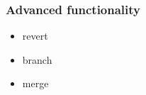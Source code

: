 \begin{frame}
	\frametitle{Advanced functionality}
	\begin{block}{}
		\begin{itemize}
			\item revert
			\item branch
			\item merge
		\end{itemize}
	\end{block}
\end{frame}
